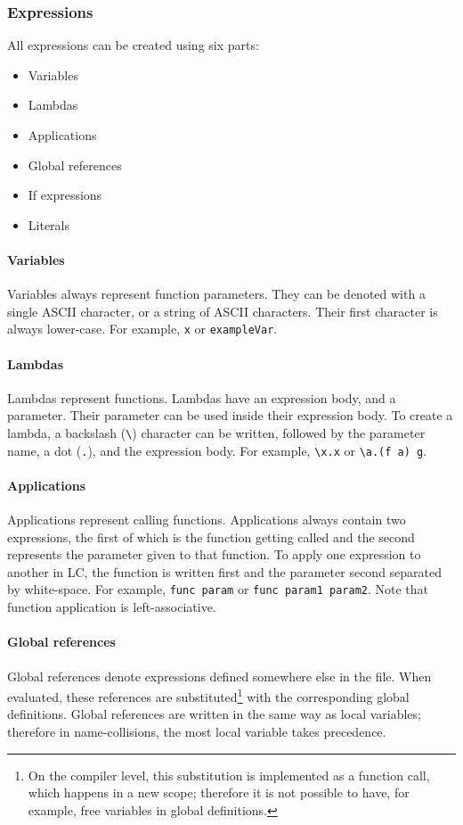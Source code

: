 \documentclass[12pt]{article}
\begin{document}
\subsubsection{Expressions}

All expressions can be created using six parts:
\begin{itemize}
    \item Variables
    \item Lambdas
    \item Applications
    \item Global references
    \item If expressions
    \item Literals
\end{itemize}

\paragraph{Variables} Variables always represent function parameters. They can
be denoted with a single ASCII character, or a string of ASCII characters. Their
first character is always lower-case. For example, \verb$x$ or
\verb$exampleVar$.

\paragraph{Lambdas} Lambdas represent functions. Lambdas have an expression
body, and a parameter. Their parameter can be used inside their expression
body. To create a lambda, a backslash (\verb$\$) character can be written,
followed by the parameter name, a dot (\verb$.$), and the expression body. For
example, \verb$\x.x$ or \verb$\a.(f a) g$.

\paragraph{Applications} Applications represent calling functions. Applications
always contain two expressions, the first of which is the function getting
called and the second represents the parameter given to that function. To apply
one expression to another in LC, the function is written first and the parameter
second separated by white-space. For example, \verb$func param$ or 
\verb$func param1 param2$.
\noindent
Note that function application is left-associative.

\paragraph{Global references} Global references denote expressions defined
somewhere else in the file. When evaluated, these references are
substituted\footnote{On the compiler level, this substitution is implemented as
    a function call, which happens in a new scope; therefore it is not possible
to have, for example, free variables in global definitions.} with the
corresponding global definitions. Global references are written in the same way
as local variables; therefore in name-collisions, the most local variable takes
precedence.
\end{document}
